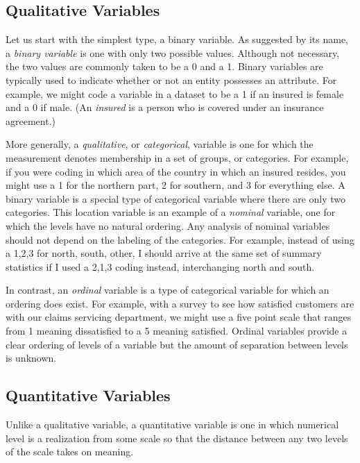 \documentclass[]{book}
\begin{document}
\subsection{Qualitative Variables}\label{qualitative-variables}

Let us start with the simplest type, a binary variable. As suggested by
its name, a \emph{binary variable} is one with only two possible values.
Although not necessary, the two values are commonly taken to be a 0 and
a 1. Binary variables are typically used to indicate whether or not an
entity possesses an attribute. For example, we might code a variable in
a dataset to be a 1 if an insured is female and a 0 if male. (An
\emph{insured} is a person who is covered under an insurance agreement.)

More generally, a \emph{qualitative}, or \emph{categorical}, variable is
one for which the measurement denotes membership in a set of groups, or
categories. For example, if you were coding in which area of the country
in which an insured resides, you might use a 1 for the northern part, 2
for southern, and 3 for everything else. A binary variable is a special
type of categorical variable where there are only two categories. This
location variable is an example of a \emph{nominal} variable, one for
which the levels have no natural ordering. Any analysis of nominal
variables should not depend on the labeling of the categories. For
example, instead of using a 1,2,3 for north, south, other, I should
arrive at the same set of summary statistics if I used a 2,1,3 coding
instead, interchanging north and south.

In contrast, an \emph{ordinal} variable is a type of categorical
variable for which an ordering does exist. For example, with a survey to
see how satisfied customers are with our claims servicing department, we
might use a five point scale that ranges from 1 meaning dissatisfied to
a 5 meaning satisfied. Ordinal variables provide a clear ordering of
levels of a variable but the amount of separation between levels is
unknown.

\subsection{Quantitative Variables}\label{quantitative-variables}

Unlike a qualitative variable, a quantitative variable is one in which
numerical level is a realization from some scale so that the distance
between any two levels of the scale takes on meaning.
\end{document}
